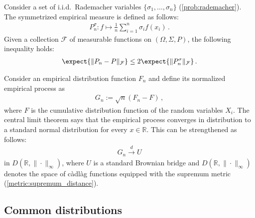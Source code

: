     \begin{property}
        Consider a set of i.i.d.~Rademacher variables $\{\sigma_1,\ldots,\sigma_n\}$ (\cref{prob:rademacher}). The symmetrized empirical measure is defined as follows:
        \begin{gather}
            P^\sigma_n:f\mapsto\frac{1}{n}\sum_{i=1}^n\sigma_if(x_i)\,.
        \end{gather}
        Given a collection $\mathcal{F}$ of measurable functions on $(\Omega,\Sigma,P)$, the following inequality holds:
        \begin{gather}
            \expect{\|P_n-P\|_{\mathcal{F}}}\leq2\expect{\|P^\sigma_n\|_{\mathcal{F}}}\,.
        \end{gather}
    \end{property}

    \begin{theorem}[Donsker]
        Consider an empirical distribution function $F_n$ and define its normalized empirical process as
        \begin{gather}
            G_n := \sqrt{n}(F_n-F)\,,
        \end{gather}
        where $F$ is the cumulative distribution function of the random variables $X_i$. The central limit theorem says that the empirical process converges in distribution to a standard normal distribution for every $x\in\mathbb{R}$. This can be strengthened as follows:
        \begin{gather}
            G_n\overset{d}{\longrightarrow}U
        \end{gather}
        in $D(\mathbb{R},\|\cdot\|_\infty)$, where $U$ is a standard Brownian bridge and $D(\mathbb{R},\|\cdot\|_\infty)$ denotes the space of c\`adl\`ag functions equipped with the supremum metric (\cref{metric:supremum_distance}).
    \end{theorem}

\subsection{Common distributions}


